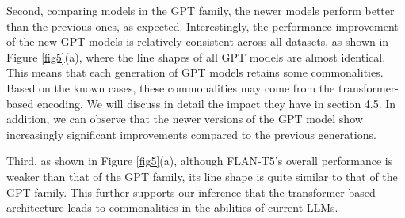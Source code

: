 \documentclass[runningheads]{llncs}
\begin{document}
Second, comparing models in the GPT family, the newer models perform better than the previous ones, as expected. Interestingly, the performance improvement of the new GPT models is relatively consistent across all datasets, as shown in Figure \ref{fig5}(a), where the line shapes of all GPT models are almost identical. This means that each generation of GPT models retains some commonalities. Based on the known cases, these commonalities may come from the transformer-based encoding. We will discuss in detail the impact they have in section 4.5. In addition, we can observe that the newer versions of the GPT model show increasingly significant improvements compared to the previous generations. 








Third, as shown in Figure \ref{fig5}(a), although FLAN-T5’s overall performance is weaker than that of the GPT family, its line shape is quite similar to that of the GPT family. This further supports our inference that the transformer-based architecture leads to commonalities in the abilities of current LLMs.
\end{document}
